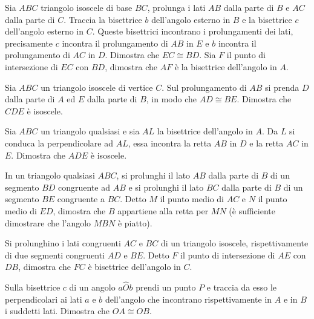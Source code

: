 \begin{multicols}{2}
\begin{esercizio}
\label{ese:2.84}
Sia \(ABC\) triangolo isoscele di base \(BC\), prolunga i lati \(AB\) dalla 
parte di \(B\) e \(AC\) dalla parte di \(C\). Traccia la bisettrice \(b\) 
dell'angolo esterno in \(B\) e la bisettrice \(c\) dell'angolo esterno in 
\(C\). Queste bisettrici incontrano i prolungamenti dei lati, 
precisamente \(c\) incontra il prolungamento di \(AB\) in \(E\) e \(b\) 
incontra il prolungamento di \(AC\) in \(D\). Dimostra che \(EC\cong BD\). 
Sia \(F\) il punto di intersezione di \(EC\) con \(BD\), dimostra che \(AF\) 
è la bisettrice dell'angolo in \(A\).
\end{esercizio}

\begin{esercizio}
\label{ese:2.85}
Sia \(ABC\) un triangolo isoscele di vertice \(C\). Sul prolungamento di 
\(AB\) si prenda \(D\) dalla parte di \(A\) ed \(E\) dalla parte di \(B\), in 
modo che \(AD\cong BE\). Dimostra che \(CDE\) è isoscele.
\end{esercizio}

\begin{esercizio}
\label{ese:2.86}
Sia \(ABC\) un triangolo qualsiasi e sia \(AL\) la bisettrice dell'angolo 
in \(A\). Da \(L\) si conduca la perpendicolare ad \(AL\), essa incontra la 
retta \(AB\) in \(D\) e la retta \(AC\) in \(E\). Dimostra che \(ADE\) è 
isoscele.
\end{esercizio}

\begin{esercizio}
\label{ese:2.87}
In un triangolo qualsiasi \(ABC\), si prolunghi il lato \(AB\) dalla 
parte di \(B\) di un segmento \(BD\) congruente ad \(AB\) e si prolunghi il 
lato \(BC\) dalla parte di \(B\) di un segmento \(BE\) congruente a \(BC\). 
Detto \(M\) il punto medio di \(AC\) e \(N\) il punto medio di \(ED\), 
dimostra che \(B\) appartiene alla retta per \(MN\) (è sufficiente 
dimostrare che l'angolo \(MBN\) è piatto).
\end{esercizio}

\begin{esercizio}
\label{ese:2.88}
Si prolunghino i lati congruenti \(AC\) e \(BC\) di un triangolo 
isoscele, rispettivamente di due segmenti congruenti \(AD\) e \(BE\). 
Detto \(F\) il punto di intersezione di \(AE\) con \(DB\), dimostra che 
\(FC\) è bisettrice dell'angolo in \(C\).
\end{esercizio}

\begin{esercizio}
\label{ese:2.89}
Sulla bisettrice \(c\) di un angolo \(a\widehat{O}b\) prendi un punto \(P\) 
e traccia da esso le perpendicolari ai lati \(a\) e \(b\) dell'angolo che 
incontrano rispettivamente in \(A\) e in \(B\) i suddetti lati. Dimostra 
che \(OA\cong OB\).
\end{esercizio}


\end{multicols}
